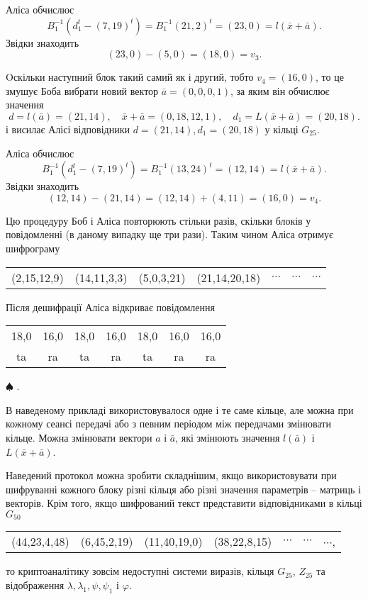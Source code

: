 \documentclass{ceurart}
\begin{document}
{Аліса обчислює
\[
  B_1^{-1}(d_1^t-(7,19)^t)=B_1^{-1}(21,2)^t=(23,0)=l(\bar x+\bar a).
\]
Звідки знаходить
\[(23,0)-(5,0)=(18,0)=v_3.\]

Oскільки наступний блок такий самий як і другий, тобто
\(v_4=(16,0)\), то це змушує Боба вибрати новий вектор
\(\bar a = (0,0,0,1)\), за яким він обчислює значення
\[
  d=l(\bar a)=(21,14), \quad \bar x+\bar a=(0,18,12,1), \quad d_1=L(\bar x +\bar a)=(20,18).
\]
і висилає Алісі відповідники \(d=(21,14), d_1=(20,18)\) у кільці \(G_{25}\).

Аліса обчислює
\[
  B_1^{-1}(d_1^t-(7,19)^t)=B_1^{-1}(13,24)^t=(12,14)=l(\bar x+\bar a).
\]
Звідки знаходить
\[
   (12,14)-(21,14)=(12,14)+(4,11)=(16,0)=v_4.
\]

Цю процедуру Боб і Аліса повторюють стільки разів, скільки блоків у
повідомленні (в даному випадку ще три рази). Таким чином Аліса отримує
шифрограму
\begin{center}
\begin{tabular}{ccccccc}
  (2,15,12,9) & (14,11,3,3) & (5,0,3,21) & (21,14,20,18) & \(\cdots\) & \(\cdots\) & \(\cdots\)\\
\end{tabular}
\end{center}
Після дешифрації Аліса відкриває повідомлення
\begin{center}
\begin{tabular}{ccccccc}
      18,0 & 16,0 & 18,0 & 16,0 & 18,0 & 16,0 & 16,0\\
       ta  &  ra  &  ta  &  ra  &  ta  &  ra  &  ra\\
\end{tabular} $\spadesuit$ .
\end{center}
} %

В наведеному прикладі використовувалося одне і те саме кільце,
але можна при кожному сеансі передачі або з певним періодом
між передачами змінювати кільце. Можна змінювати вектори \(a\)
і \(\bar a\), які змінюють значення \(l(\bar a)\) і \(L(\bar x +\bar a)\).

Наведений протокол можна зробити складнішим, якщо використовувати
при шифруванні кожного блоку різні кільця або різні значення
параметрів -- матриць і векторів.
Крім того, якщо шифрований текст представити відповідниками
в кільці \(G_{50}\)
\begin{center}
{\footnotesize %
\begin{tabular}{ccccccc}
  (44,23,4,48) & (6,45,2,19) & (11,40,19,0) & (38,22,8,15) & \(\cdots\) & \(\cdots\) & \(\cdots\), \\
\end{tabular}}
\end{center}
то криптоаналітику зовсім недоступні системи виразів, кільця \(G_{25}\),
\(Z_{25}\) та відображення \(\lambda,\lambda_1,\psi,\psi_1\) і \(\varphi\).
\end{document}
